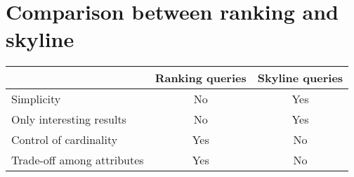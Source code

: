 \section{Comparison between ranking and skyline}

\begin{table}[H]
    \centering
    \begin{tabular}{l|cc|}
    \cline{2-3}
                                                     & \textbf{Ranking queries} & \textbf{Skyline queries}  \\ \hline
    \multicolumn{1}{|l|}{Simplicity}                 & No                       & Yes                       \\
    \multicolumn{1}{|l|}{Only interesting results}   & No                       & Yes                       \\
    \multicolumn{1}{|l|}{Control of cardinality}     & Yes                      & No                        \\
    \multicolumn{1}{|l|}{Trade-off among attributes} & Yes                      & No                        \\ \hline
    \end{tabular}
\end{table}